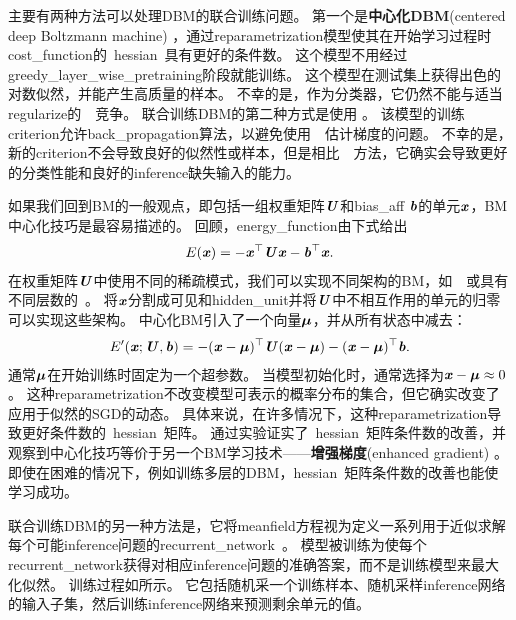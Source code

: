 
主要有两种方法可以处理\gls{DBM}的联合训练问题。
第一个是\textbf{中心化\gls{DBM}}(centered deep Boltzmann machine) \citep{Montavon2012}，通过\gls{reparametrization}模型使其在开始学习过程时\gls{cost_function}的~\gls{hessian}~具有更好的条件数。
这个模型不用经过\gls{greedy_layer_wise_pretraining}阶段就能训练。
这个模型在测试集上获得出色的对数似然，并能产生高质量的样本。
不幸的是，作为分类器，它仍然不能与适当\gls{regularize}的~~竞争。
联合训练\gls{DBM}的第二种方式是使用 \citep{Goodfellow-et-al-NIPS2013}。
该模型的训练\gls{criterion}允许\gls{back_propagation}算法，以避免使用~~估计梯度的问题。
不幸的是，新的\gls{criterion}不会导致良好的似然性或样本，但是相比~~方法，它确实会导致更好的分类性能和良好的\gls{inference}缺失输入的能力。

如果我们回到\gls{BM}的一般观点，即包括一组权重矩阵$\boldsymbol{\mathit{U}}$和\gls{bias_aff} $\boldsymbol{\mathit{b}}$的单元$\boldsymbol{\mathit{x}}$，\gls{BM}中心化技巧是最容易描述的。
回顾，\gls{energy_function}由下式给出
\begin{align}
 E(\boldsymbol{\mathit{x}}) = -\boldsymbol{\mathit{x}}^\top \boldsymbol{\mathit{U}} \boldsymbol{\mathit{x}} - \boldsymbol{\mathit{b}}^\top \boldsymbol{\mathit{x}}.
\end{align}
在权重矩阵$\boldsymbol{\mathit{U}}$中使用不同的稀疏模式，我们可以实现不同架构的\gls{BM}，如~~或具有不同层数的~。
将$\boldsymbol{\mathit{x}}$分割成可见和\gls{hidden_unit}并将$\boldsymbol{\mathit{U}}$中不相互作用的单元的归零可以实现这些架构。
中心化\gls{BM}引入了一个向量$\boldsymbol{\mu}$，并从所有状态中减去：
\begin{align}
    E^{\prime}(\boldsymbol{\mathit{x}}; \boldsymbol{\mathit{U}}, \boldsymbol{\mathit{b}}) = -(\boldsymbol{\mathit{x}} - \boldsymbol{\mu})^\top \boldsymbol{\mathit{U}} (\boldsymbol{\mathit{x}} - \boldsymbol{\mu}) - (\boldsymbol{\mathit{x}} - \boldsymbol{\mu})^\top \boldsymbol{\mathit{b}}.
\end{align}
通常$\boldsymbol{\mu}$在开始训练时固定为一个超参数。
当模型初始化时，通常选择为$\boldsymbol{\mathit{x}} - \boldsymbol{\mu} \approx 0$。
这种\gls{reparametrization}不改变模型可表示的概率分布的集合，但它确实改变了应用于似然的\gls{SGD}的动态。
具体来说，在许多情况下，这种\gls{reparametrization}导致更好条件数的~\gls{hessian}~矩阵。
\citet{melchior2013center}通过实验证实了~\gls{hessian}~矩阵条件数的改善，并观察到中心化技巧等价于另一个\gls{BM}学习技术——\textbf{增强梯度}(enhanced gradient) \citep{ICML2011Cho_98-small}。
即使在困难的情况下，例如训练多层的\gls{DBM}，\gls{hessian}~矩阵条件数的改善也能使学习成功。


联合训练\gls{DBM}的另一种方法是，它将\gls{meanfield}方程视为定义一系列用于近似求解每个可能\gls{inference}问题的\gls{recurrent_network}~\citep{Goodfellow-et-al-NIPS2013}。
模型被训练为使每个\gls{recurrent_network}获得对相应\gls{inference}问题的准确答案，而不是训练模型来最大化似然。
训练过程如所示。
它包括随机采一个训练样本、随机采样\gls{inference}网络的输入子集，然后训练\gls{inference}网络来预测剩余单元的值。

